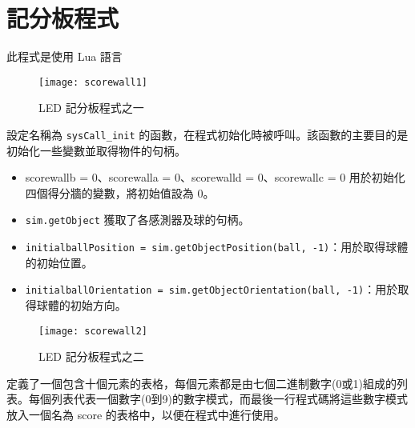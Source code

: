 \section{記分板程式}
此程式是使用 Lua 語言
\begin{figure}[hbt!]
\begin{center}
\texttt{[image: scorewall1]}
\caption{\Large LED 記分板程式之一}\label{LED 記分板程式之一}
\end{center}
\end{figure} 
設定名稱為 \texttt{sysCall_init} 的函數，在程式初始化時被呼叫。該函數的主要目的是初始化一些變數並取得物件的句柄。\\
\begin{itemize}
\item scorewallb = 0、scorewalla = 0、scorewalld = 0、scorewallc = 0 用於初始化四個得分牆的變數，將初始值設為 0。\\
\item \texttt{sim.getObject} 獲取了各感測器及球的句柄。\\
\item \texttt{initialballPosition = sim.getObjectPosition(ball, -1)}：用於取得球體的初始位置。\\
\item \texttt{initialballOrientation = sim.getObjectOrientation(ball, -1)}：用於取得球體的初始方向。\\
\end{itemize}

\begin{figure}[hbt!]
\begin{center}
\texttt{[image: scorewall2]}
\caption{\Large LED 記分板程式之二}\label{LED 記分板程式之二}
\end{center}
\end{figure} 
定義了一個包含十個元素的表格，每個元素都是由七個二進制數字(0或1)組成的列表。每個列表代表一個數字(0到9)的數字模式，而最後一行程式碼將這些數字模式放入一個名為 score 的表格中，以便在程式中進行使用。\\

